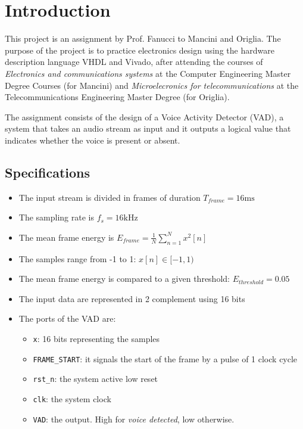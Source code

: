 \section{Introduction}

This project is an assignment by Prof. Fanucci to Mancini and Origlia.
The purpose of the project is to practice electronics design using
the hardware description language VHDL and Vivado, after attending the courses
of \textit{Electronics and communications systems} at the Computer Engineering
Master Degree Courses (for Mancini) and \textit{Microelecronics for telecommunications}
at the Telecommunications Engineering Master Degree (for Origlia).

The assignment consists of the design of a Voice Activity Detector (VAD), a
system that takes an audio stream as input and it outputs a logical value that
indicates whether the voice is present or absent.

\subsection*{Specifications}
\begin{itemize}
  \item The input stream is divided in frames of duration
  $T_{frame} = 16\si{\milli\second}$
  \item The sampling rate is $f_s = 16 \si{\kilo\hertz}$
  \item The mean frame energy is $ E_{frame} = \frac{1}{N}\sum_{n=1}^N x^2[n] $
  \item The samples range from -1 to 1: $x[n] \in [-1, 1)$
  \item The mean frame energy is compared to a given threshold:
  $ E_{threshold} = 0.05 $
  \item The input data are represented in 2 complement using 16 bits
  \item The ports of the VAD are:
  \begin{itemize}
    \item \texttt{x}: 16 bits representing the samples
    \item \texttt{FRAME\_START}: it signals the start of the frame by
    a pulse of 1 clock cycle
    \item \texttt{rst\_n}: the system active low reset
    \item \texttt{clk}: the system clock
    \item \texttt{VAD}: the output. High for \textit{voice detected},
    low otherwise.
  \end{itemize}
\end{itemize}
